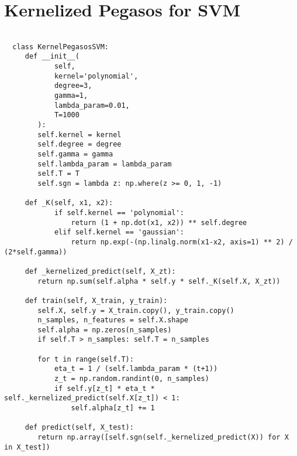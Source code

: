 \section{Kernelized Pegasos for SVM}\label{appendix:kernel_pegasos}

\begin{verbatim}

  class KernelPegasosSVM:
     def __init__(
            self,
            kernel='polynomial',
            degree=3,
            gamma=1,
            lambda_param=0.01,
            T=1000
        ):
        self.kernel = kernel
        self.degree = degree
        self.gamma = gamma
        self.lambda_param = lambda_param
        self.T = T
        self.sgn = lambda z: np.where(z >= 0, 1, -1)

     def _K(self, x1, x2):
            if self.kernel == 'polynomial':
                return (1 + np.dot(x1, x2)) ** self.degree
            elif self.kernel == 'gaussian':
                return np.exp(-(np.linalg.norm(x1-x2, axis=1) ** 2) / (2*self.gamma))

     def _kernelized_predict(self, X_zt):
        return np.sum(self.alpha * self.y * self._K(self.X, X_zt))

     def train(self, X_train, y_train):
        self.X, self.y = X_train.copy(), y_train.copy()
        n_samples, n_features = self.X.shape
        self.alpha = np.zeros(n_samples)
        if self.T > n_samples: self.T = n_samples

        for t in range(self.T):
            eta_t = 1 / (self.lambda_param * (t+1))
            z_t = np.random.randint(0, n_samples)
            if self.y[z_t] * eta_t * self._kernelized_predict(self.X[z_t]) < 1:
                self.alpha[z_t] += 1

     def predict(self, X_test):
        return np.array([self.sgn(self._kernelized_predict(X)) for X in X_test])

\end{verbatim}